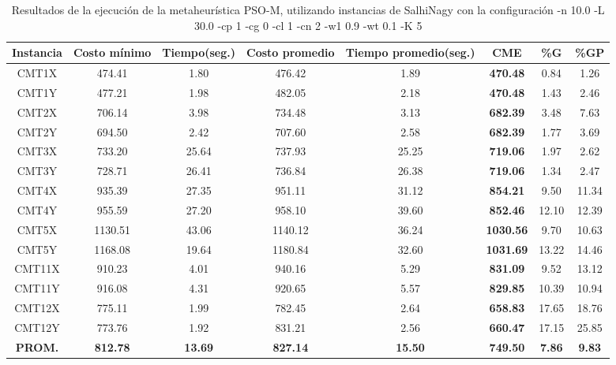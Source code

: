 \begin{table}[h]
\caption{Resultados de la ejecución de la metaheurística PSO-M, utilizando instancias de SalhiNagy con la configuración -n 10.0 -L 30.0 -cp 1 -cg 0 -cl 1 -cn 2 -w1 0.9 -wt 0.1 -K 5}
\centering
\small
\begin{tabular}{c c c c c c c c}
\hline\hline
Instancia & Costo mínimo & Tiempo(seg.) & Costo promedio & Tiempo promedio(seg.) & CME & \%G & \%GP \\ [0.5ex]
\hline
CMT1X & 474.41 & 1.80 & 
476.42 & 1.89 & \bf{470.48} & 
0.84 & 1.26\\CMT1Y & 477.21 & 1.98 & 
482.05 & 2.18 & \bf{470.48} & 
1.43 & 2.46\\CMT2X & 706.14 & 3.98 & 
734.48 & 3.13 & \bf{682.39} & 
3.48 & 7.63\\CMT2Y & 694.50 & 2.42 & 
707.60 & 2.58 & \bf{682.39} & 
1.77 & 3.69\\CMT3X & 733.20 & 25.64 & 
737.93 & 25.25 & \bf{719.06} & 
1.97 & 2.62\\CMT3Y & 728.71 & 26.41 & 
736.84 & 26.38 & \bf{719.06} & 
1.34 & 2.47\\CMT4X & 935.39 & 27.35 & 
951.11 & 31.12 & \bf{854.21} & 
9.50 & 11.34\\CMT4Y & 955.59 & 27.20 & 
958.10 & 39.60 & \bf{852.46} & 
12.10 & 12.39\\CMT5X & 1130.51 & 43.06 & 
1140.12 & 36.24 & \bf{1030.56} & 
9.70 & 10.63\\CMT5Y & 1168.08 & 19.64 & 
1180.84 & 32.60 & \bf{1031.69} & 
13.22 & 14.46\\CMT11X & 910.23 & 4.01 & 
940.16 & 5.29 & \bf{831.09} & 
9.52 & 13.12\\CMT11Y & 916.08 & 4.31 & 
920.65 & 5.57 & \bf{829.85} & 
10.39 & 10.94\\CMT12X & 775.11 & 1.99 & 
782.45 & 2.64 & \bf{658.83} & 
17.65 & 18.76\\CMT12Y & 773.76 & 1.92 & 
831.21 & 2.56 & \bf{660.47} & 
17.15 & 25.85\\\bf{PROM.} & 
\bf{812.78} & \bf{13.69} & \bf{827.14} & \bf{15.50} & \bf{749.50} & \bf{7.86} & \bf{9.83}\\[1ex]\hline
\end{tabular}
\label{table:nonlin}
\end{table}
